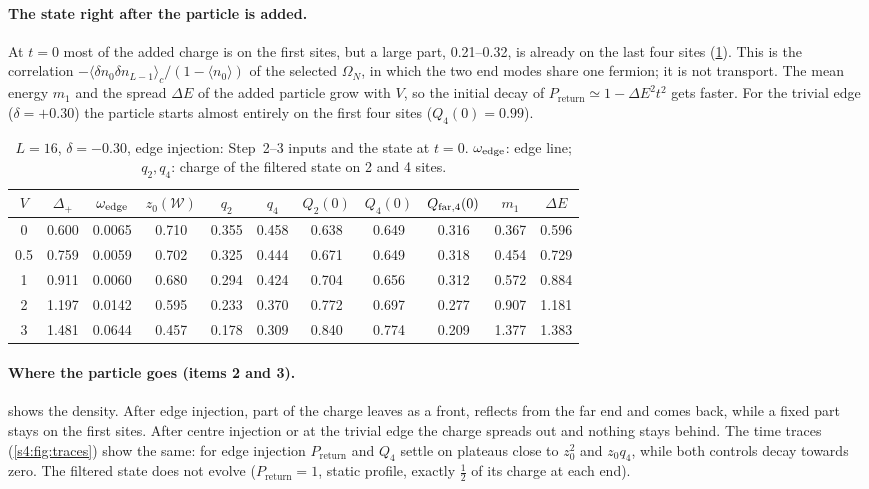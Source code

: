 \documentclass[11pt,a4paper]{article}
\newcommand{\Om}{\Omega_N}
\newcommand{\Dp}{\Delta_{+}}
\newcommand{\Prt}{P_{\mathrm{return}}}
\newcommand{\Wcal}{\mathcal{W}}
\begin{document}
\paragraph{The state right after the particle is added.} At $t=0$ most of the added charge is on the first sites, but a large part, 0.21--0.32, is already on the last four sites (\cref{s4:tab:t0}). This is the correlation $-\langle\delta n_0\delta n_{L-1}\rangle_c/(1-\langle n_0\rangle)$ of the selected $\Om$, in which the two end modes share one fermion; it is not transport. The mean energy $m_1$ and the spread $\Delta E$ of the added particle grow with $V$, so the initial decay of $\Prt\simeq1-\Delta E^2t^2$ gets faster. For the trivial edge ($\delta=+0.30$) the particle starts almost entirely on the first four sites ($Q_4(0)=0.99$).

\begin{table}[htbp]
\centering\small
\caption{$L=16$, $\delta=-0.30$, edge injection: Step~2--3 inputs and the state at $t=0$. $\omega_{\rm edge}$: edge line; $q_2,q_4$: charge of the filtered state on 2 and 4 sites.}
\label{s4:tab:t0}
\begin{tabular}{@{}c cccccc cccc@{}}
\toprule
$V$ & $\Dp$ & $\omega_{\rm edge}$ & $z_0(\Wcal)$ & $q_2$ & $q_4$ & $Q_2(0)$ & $Q_4(0)$ & $Q_{\rm far,4}(0)$ & $m_1$ & $\Delta E$\\
\midrule
0   & 0.600 & 0.0065 & 0.710 & 0.355 & 0.458 & 0.638 & 0.649 & 0.316 & 0.367 & 0.596\\
0.5 & 0.759 & 0.0059 & 0.702 & 0.325 & 0.444 & 0.671 & 0.649 & 0.318 & 0.454 & 0.729\\
1   & 0.911 & 0.0060 & 0.680 & 0.294 & 0.424 & 0.704 & 0.656 & 0.312 & 0.572 & 0.884\\
2   & 1.197 & 0.0142 & 0.595 & 0.233 & 0.370 & 0.772 & 0.697 & 0.277 & 0.907 & 1.181\\
3   & 1.481 & 0.0644 & 0.457 & 0.178 & 0.309 & 0.840 & 0.774 & 0.209 & 1.377 & 1.383\\
\bottomrule
\end{tabular}
\end{table}

\paragraph{Where the particle goes (items 2 and 3).}  shows the density. After edge injection, part of the charge leaves as a front, reflects from the far end and comes back, while a fixed part stays on the first sites. After centre injection or at the trivial edge the charge spreads out and nothing stays behind. The time traces (\cref{s4:fig:traces}) show the same: for edge injection $\Prt$ and $Q_4$ settle on plateaus close to $z_0^2$ and $z_0q_4$, while both controls decay towards zero. The filtered state does not evolve ($\Prt=1$, static profile, exactly $\tfrac12$ of its charge at each end).
\end{document}
